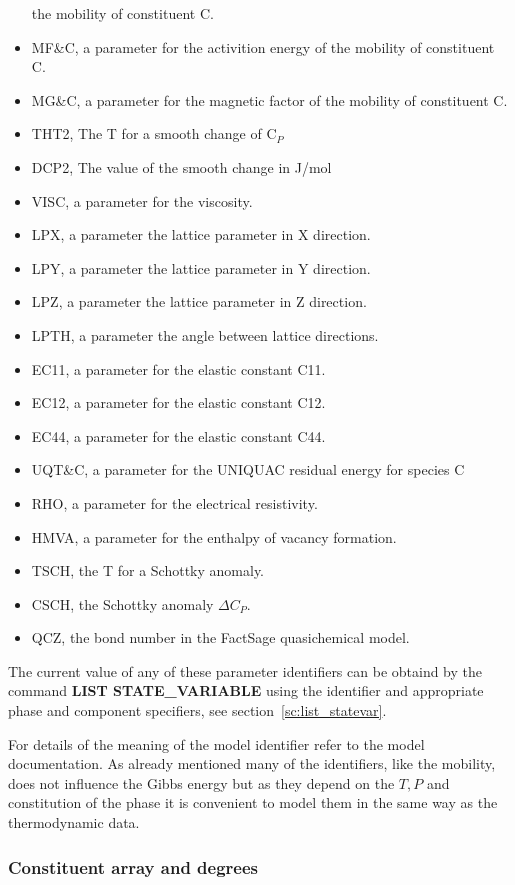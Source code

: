 \documentclass[11pt]{article}
\begin{document}
\begin{itemize}
  the mobility of constituent C.
\item MF\&C, a parameter for the activition energy of the mobility of
  constituent C.
\item MG\&C, a parameter for the magnetic factor of the mobility of
  constituent C.
\item THT2, The T for a smooth change of C$_P$ 
\item DCP2, The value of the smooth change in J/mol
\item VISC, a parameter for the viscosity.
\item LPX, a parameter the lattice parameter in X direction.
\item LPY, a parameter the lattice parameter in Y direction.
\item LPZ, a parameter the lattice parameter in Z direction.
\item LPTH, a parameter the angle between lattice directions.
\item EC11, a parameter for the elastic constant C11.
\item EC12, a parameter for the elastic constant C12.
\item EC44, a parameter for the elastic constant C44.
\item UQT\&C, a parameter for the UNIQUAC residual energy for species C
\item RHO, a parameter for the electrical resistivity.
\item HMVA, a parameter for the enthalpy of vacancy formation.
\item TSCH, the T for a Schottky anomaly.
\item CSCH, the Schottky anomaly $\Delta C_P$.
\item QCZ, the bond number in the FactSage quasichemical model.
\end{itemize}

The current value of any of these parameter identifiers can be obtaind
by the command {\bf LIST STATE\_VARIABLE} using the identifier and
appropriate phase and component specifiers, see
section~\ref{sc:list_statevar}.

For details of the meaning of the model identifier refer to the model
documentation.  As already mentioned many of the identifiers, like the
mobility, does not influence the Gibbs energy but as they depend on
the $T, P$ and constitution of the phase it is convenient to model
them in the same way as the thermodynamic data.

\subsubsection{Constituent array and degrees}
\end{document}
